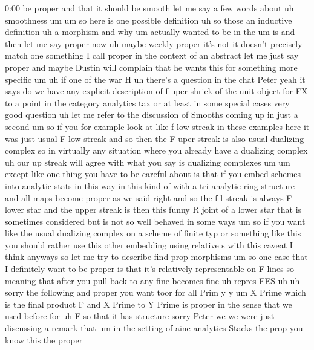\begin{unfinished}{0:00}
be  proper  and  that  it  should  be  smooth
let  me  say  a  few  words  about
uh
smoothness  um  um  so  here  is  one  possible
definition  uh  so  those  an  inductive
definition  uh  a
morphism
and
why
um  actually  wanted  to  be  in
the
um  is  and
then  let  me  say  proper  now
uh  maybe  weekly  proper  it's  not  it
doesn't  precisely  match  one  something  I
call  proper  in  the  context  of  an
abstract  let  me  just
say  proper  and  maybe  Dustin  will
complain  that  he  wants  this  for
something  more  specific  um
uh  if  one  of  the  war
H  uh  there's  a  question  in  the  chat
Peter  yeah  it  says  do  we  have  any
explicit  description  of  f  uper  shriek  of
the  unit  object  for  FX  to  a  point  in  the
category  analytics  tax  or  at  least  in
some  special  cases
very  good  question  uh  let  me  refer  to
the  discussion  of  Smooths  coming  up  in
just  a  second  um  so  if  you  for  example
look
at  like  f  low  streak  in  these  examples
here  it  was  just  usual  F  low  streak  and
so  then  the  F  uper  streak  is  also  usual
dualizing  complex  so  in  virtually  any
situation  where  you  already  have  a
dualizing  complex  uh  our  up  streak  will
agree  with  what  you  say  is  dualizing
complexes  um
um  except  like  one  thing  you  have  to  be
careful  about  is  that  if  you  embed
schemes  into  analytic  stats  in  this  way
in  this  kind  of  with  a  tri  analytic  ring
structure  and  all  maps  become  proper  as
we  said  right  and  so  the  f  l  streak  is
always  F  lower  star  and  the  upper  streak
is  then  this  funny  R  joint  of  a  lower
star  that  is  sometimes  considered  but
is  not  so  well  behaved  in  some  ways  um
so  if  you  want  like  the  usual  dualizing
complex  on  a  scheme  of  finite  typ  or
something  like  this  you  should  rather
use  this  other  embedding  using  relative
s  with  this  caveat  I  think  anyways  so
let  me  try  to  describe  find  prop
morphisms
um  so  one  case  that  I  definitely  want  to
be  proper  is  that  it's  relatively
representable  on  F
lines
so  meaning  that  after  you  pull  back  to
any
fine  becomes
fine  uh  repres
FES
uh  uh  sorry  the  following  and
proper  you  want
toor  for  all  Prim
y
y  um  X  Prime  which  is  the  final
product
F  and  X  Prime  to  Y  Prime  is  proper  in
the  sense  that  we  used  before  for  uh  F
so  that  it  has
structure
sorry  Peter  we  we  were  just  discussing  a
remark  that  um  in  the  setting  of  aine
analytics
Stacks  the  prop  you  know  this  the  proper

\end{unfinished}
